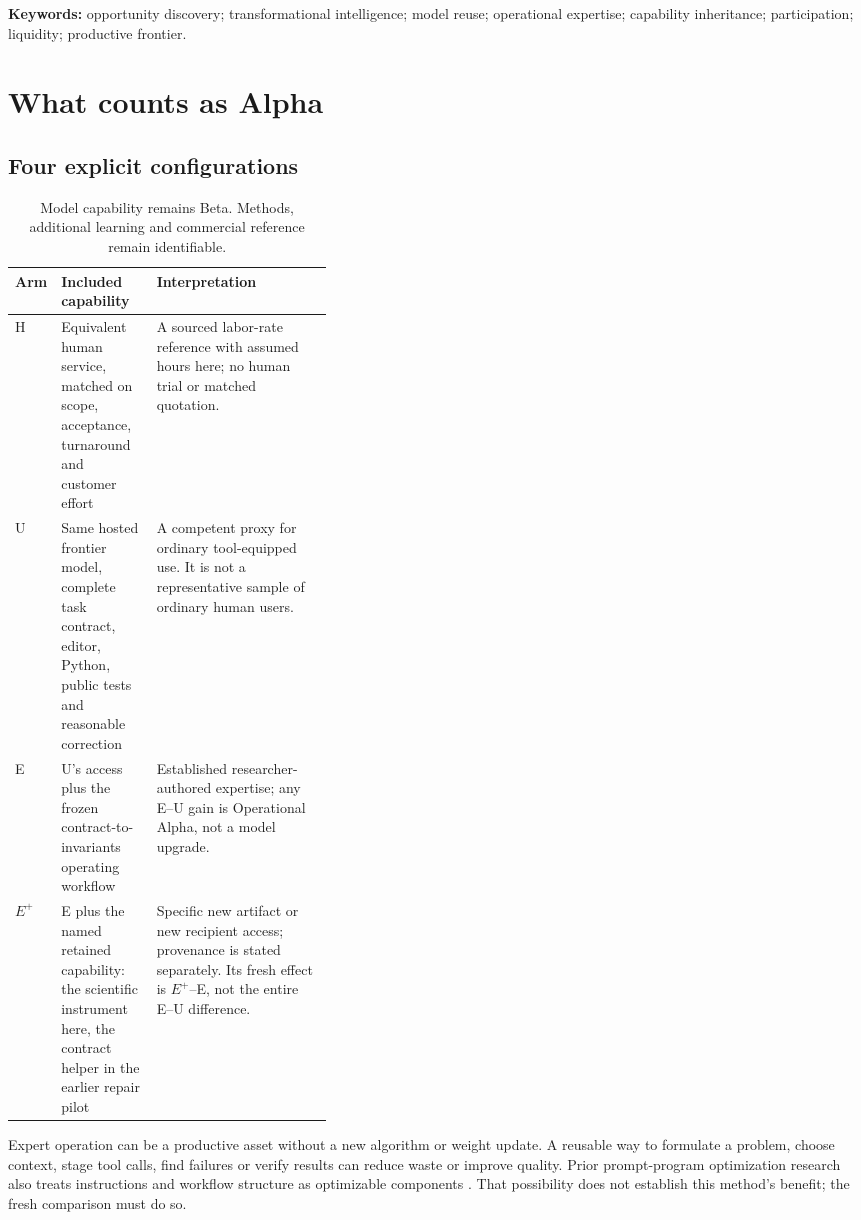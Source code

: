\documentclass[11pt,letterpaper]{article}
\newcommand{\Eplus}{\ensuremath{E^{+}}}
\begin{document}
\textbf{Keywords:} opportunity discovery; transformational intelligence; model reuse; operational expertise; capability inheritance; participation; liquidity; productive frontier.


\section{What counts as Alpha}
\subsection{Four explicit configurations}
\begin{table}[H]\small
\begin{tabularx}{\linewidth}{@{}p{0.07\linewidth}p{0.30\linewidth}X@{}}\toprule
Arm & Included capability & Interpretation \\ \midrule
H & Equivalent human service, matched on scope, acceptance, turnaround and customer effort & A sourced labor-rate reference with assumed hours here; no human trial or matched quotation. \\
U & Same hosted frontier model, complete task contract, editor, Python, public tests and reasonable correction & A competent proxy for ordinary tool-equipped use. It is not a representative sample of ordinary human users. \\
E & U's access plus the frozen contract-to-invariants operating workflow & Established researcher-authored expertise; any E--U gain is Operational Alpha, not a model upgrade. \\
\Eplus & E plus the named retained capability: the scientific instrument here, the contract helper in the earlier repair pilot & Specific new artifact or new recipient access; provenance is stated separately. Its fresh effect is \Eplus--E, not the entire E--U difference. \\ \bottomrule
\end{tabularx}
\caption{Model capability remains Beta. Methods, additional learning and commercial reference remain identifiable.}
\end{table}

Expert operation can be a productive asset without a new algorithm or weight update. A reusable way to formulate a problem, choose context, stage tool calls, find failures or verify results can reduce waste or improve quality. Prior prompt-program optimization research also treats instructions and workflow structure as optimizable components \cite{dspy,textgrad}. That possibility does not establish this method's benefit; the fresh comparison must do so.
\end{document}
